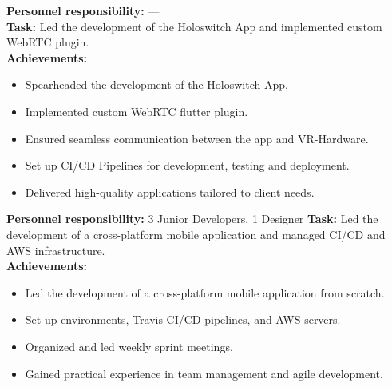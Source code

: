 \documentclass[10pt,a4paper,normalphoto]{altacv}
\begin{document}
\begin{fullwidth}
\vspace{1em}


\newpage

\textbf{Personnel responsibility:} —\\
\textbf{Task:} Led the development of the Holoswitch App and implemented custom WebRTC plugin.\\
\textbf{Achievements:}
\begin{itemize}
    \item Spearheaded the development of the Holoswitch App.
    \item Implemented custom WebRTC flutter plugin.
    \item Ensured seamless communication between the app and VR-Hardware.
    \item Set up CI/CD Pipelines for development, testing and deployment.
    \item Delivered high-quality applications tailored to client needs.
\end{itemize}

\vspace{1em}


\vspace{2em}

\textbf{Personnel responsibility:} 3 Junior Developers, 1 Designer
\textbf{Task:} Led the development of a cross-platform mobile application and managed CI/CD and AWS infrastructure.\\
\textbf{Achievements:}
\begin{itemize}
    \item Led the development of a cross-platform mobile application from scratch.
    \item Set up environments, Travis CI/CD pipelines, and AWS servers.
    \item Organized and led weekly sprint meetings.
    \item Gained practical experience in team management and agile development.
\end{itemize}


\end{fullwidth}
\end{document}

